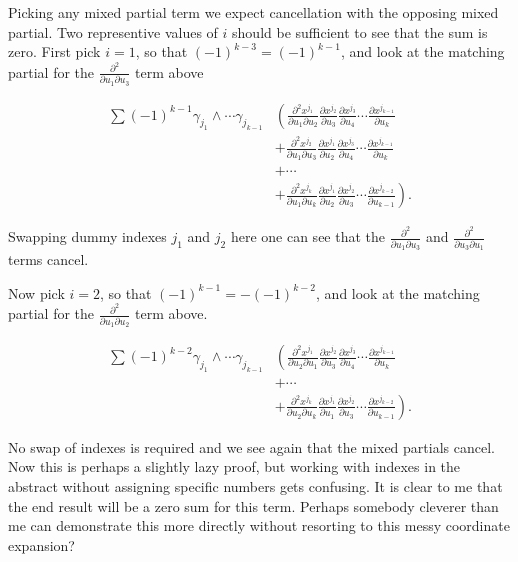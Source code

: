 \documentclass{article}
\newcommand{\PD}[2]{\frac{\partial {#2}}{\partial {#1}}}
\newcommand{\PDD}[3]{\frac{\partial^2 {#3}}{\partial {#1}\partial {#2}}}
\begin{document}
Picking any mixed partial term we expect cancellation with the opposing mixed partial.  Two representive values of $i$ should be sufficient to see that the sum
is zero.  First pick $i=1$, so that $(-1)^{k-3} = (-1)^{k-1}$, and look at the 
matching partial for the $\PDD{u_1}{u_3}{}$ term above

\begin{align*}
\sum (-1)^{k-1} \gamma_{j_1} \wedge \cdots \gamma_{j_{k-1}} 
&\left(\PDD{u_1}{u_2}{x^{j_1}} \PD{u_3}{x^{j_{2}}} \PD{u_4}{x^{j_3}} \cdots \PD{u_k}{x^{j_{k-1}}}\right. \\
&+\PDD{u_1}{u_3}{x^{j_2}} \PD{u_2}{x^{j_1}} \PD{u_4}{x^{j_3}} \cdots \PD{u_k}{x^{j_{k-1}}} \\
&+\cdots \\
&+\left.\PDD{u_1}{u_k}{x^{j_k}} \PD{u_2}{x^{j_1}} \PD{u_3}{x^{j_2}} \cdots \PD{u_{k-1}}{x^{j_{k-2}}}\right).
\end{align*}

Swapping dummy indexes $j_1$ and $j_2$ here one can see that the 
$\PDD{u_1}{u_3}{}$ and $\PDD{u_3}{u_1}{}$ terms cancel.

Now pick $i=2$, so 
that $(-1)^{k-1} = -(-1)^{k-2}$, and look at the 
matching partial for the $\PDD{u_1}{u_2}{}$ term above.

\begin{align*}
\sum (-1)^{k-2} \gamma_{j_1} \wedge \cdots \gamma_{j_{k-1}} 
&\left(\PDD{u_2}{u_1}{x^{j_1}} \PD{u_3}{x^{j_{2}}} \PD{u_4}{x^{j_3}} \cdots \PD{u_k}{x^{j_{k-1}}}\right. \\
&+\cdots \\
&+\left.\PDD{u_2}{u_k}{x^{j_k}} \PD{u_1}{x^{j_1}} \PD{u_3}{x^{j_2}} \cdots \PD{u_{k-1}}{x^{j_{k-2}}}\right).
\end{align*}

No swap of indexes is required and we see again that the mixed partials cancel.  Now this is perhaps a slightly lazy proof, but working with
indexes in the abstract without assigning specific numbers gets confusing.  It is clear to me that the end result will be a zero sum for this term.
Perhaps somebody cleverer than me can demonstrate this more directly without resorting to this messy coordinate expansion?
\end{document}
